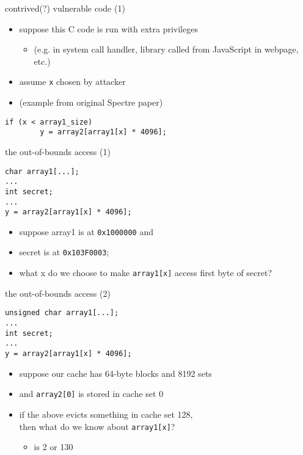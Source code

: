 \begin{frame}[fragile]{contrived(?) vulnerable code (1)}
\begin{itemize}
\item suppose this C code is run with extra privileges
    \begin{itemize}
    \item (e.g. in system call handler, library called from JavaScript in webpage, etc.)
    \end{itemize}
\item assume \texttt{x} chosen by attacker
\item (example from original Spectre paper)
\end{itemize}
\begin{lstlisting}
if (x < array1_size)
        y = array2[array1[x] * 4096];
\end{lstlisting}
\end{frame}

\begin{frame}[fragile]{the out-of-bounds access (1)}
\begin{lstlisting}
char array1[...];
...
int secret;
...
y = array2[array1[x] * 4096];
\end{lstlisting}
\begin{itemize}
\item suppose array1 is at \texttt{0x1000000} and
\item secret is at \texttt{0x103F0003};
\item what x do we choose to make \lstinline|array1[x]| access first byte of secret?
\end{itemize}
\end{frame}

\begin{frame}[fragile]{the out-of-bounds access (2)}
\begin{lstlisting}
unsigned char array1[...];
...
int secret;
...
y = array2[array1[x] * 4096];
\end{lstlisting}
\begin{itemize}
\item suppose our cache has 64-byte blocks and 8192 sets
\item and \lstinline|array2[0]| is stored in cache set 0
\vspace{.5cm}
\item if the above evicts something in cache set 128, \\
      then what do we know about \texttt{array1[x]}?
    \begin{itemize}
    \item<2-> is 2 or 130
    \end{itemize}
\end{itemize}
\end{frame}

